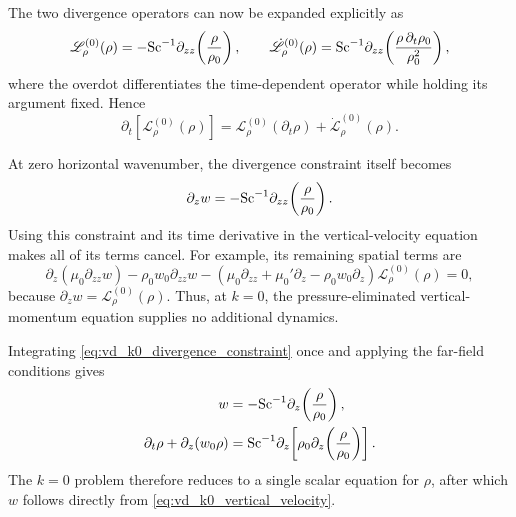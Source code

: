 The two divergence operators can now be expanded explicitly as
\begin{equation}
  \mathscr{L}_{\rho}^{(0)}(\rho)
  =-\mathrm{Sc}^{-1}\partial_{zz}\!\left(\frac{\rho}{\rho_0}\right),
  \qquad
  \dot{\mathscr{L}}_{\rho}^{(0)}(\rho)
  =\mathrm{Sc}^{-1}\partial_{zz}\!\left(
    \frac{\rho\,\partial_t\rho_0}{\rho_0^2}
  \right),
  \label{eq:vd_k0_expanded_divergence_operators}
\end{equation}
where the overdot differentiates the time-dependent operator while holding its
argument fixed. Hence
\begin{equation}
  \partial_t\!\left[\mathscr{L}_{\rho}^{(0)}(\rho)\right]
  =\mathscr{L}_{\rho}^{(0)}(\partial_t\rho)
   +\dot{\mathscr{L}}_{\rho}^{(0)}(\rho).
  \label{eq:vd_k0_operator_product_rule}
\end{equation}

At zero horizontal wavenumber, the divergence constraint itself becomes
\begin{equation}
  \partial_z w
  =-\mathrm{Sc}^{-1}\partial_{zz}\!\left(\frac{\rho}{\rho_0}\right).
  \label{eq:vd_k0_divergence_constraint}
\end{equation}
Using this constraint and its time derivative in the vertical-velocity equation
makes all of its terms cancel. For example, its remaining spatial terms are
\begin{equation}
  \partial_z\!\left(\mu_0\partial_{zz}w\right)
  -\rho_0w_0\partial_{zz}w
  -\left(\mu_0\partial_{zz}+\mu_0'\partial_z
  -\rho_0w_0\partial_z\right)
  \mathscr{L}_{\rho}^{(0)}(\rho)=0,
\end{equation}
because \(\partial_z w=\mathscr{L}_{\rho}^{(0)}(\rho)\). Thus, at \(k=0\),
the pressure-eliminated vertical-momentum equation supplies no additional
dynamics.

Integrating \eqref{eq:vd_k0_divergence_constraint} once and applying the
far-field conditions gives
\begin{subequations}
  \label{eq:vd_k0_linearized_system}
  \begin{align}
    w
    &=-\mathrm{Sc}^{-1}\partial_z\!\left(\frac{\rho}{\rho_0}\right),
    \label{eq:vd_k0_vertical_velocity}\\
    \partial_t\rho+\partial_z(w_0\rho)
    &=\mathrm{Sc}^{-1}\partial_z\!\left[
      \rho_0\partial_z\!\left(\frac{\rho}{\rho_0}\right)
    \right].
    \label{eq:vd_k0_density}
  \end{align}
\end{subequations}
The \(k=0\) problem therefore reduces to a single scalar equation for \(\rho\),
after which \(w\) follows directly from \eqref{eq:vd_k0_vertical_velocity}.

